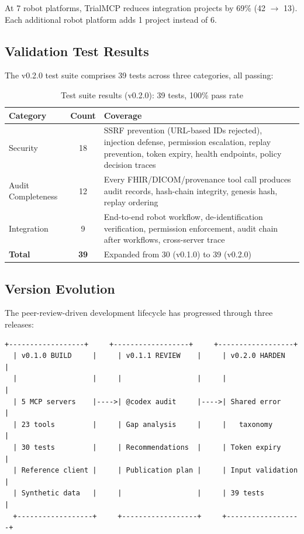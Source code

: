\documentclass[10pt,letterpaper]{article}
\begin{document}
At 7 robot platforms, TrialMCP reduces integration projects by 69\% (42 $\rightarrow$ 13). Each additional robot platform adds 1 project instead of 6.

\subsection{Validation Test Results}

The v0.2.0 test suite comprises 39 tests across three categories, all passing:

\begin{table}[H]
\centering
\caption{Test suite results (v0.2.0): 39 tests, 100\% pass rate}
\label{tab:tests}
\small
\begin{tabularx}{\textwidth}{l c X}
\toprule
\textbf{Category} & \textbf{Count} & \textbf{Coverage} \\
\midrule
Security & 18 & SSRF prevention (URL-based IDs rejected), injection defense, permission escalation, replay prevention, token expiry, health endpoints, policy decision traces \\
Audit Completeness & 12 & Every FHIR/DICOM/provenance tool call produces audit records, hash-chain integrity, genesis hash, replay ordering \\
Integration & 9 & End-to-end robot workflow, de-identification verification, permission enforcement, audit chain after workflows, cross-server trace \\
\midrule
\textbf{Total} & \textbf{39} & Expanded from 30 (v0.1.0) to 39 (v0.2.0) \\
\bottomrule
\end{tabularx}
\end{table}

\subsection{Version Evolution}

The peer-review-driven development lifecycle has progressed through three releases:

\begin{lstlisting}[title={\textbf{Release Progression: v0.1.0 -> v0.1.1 -> v0.2.0}}]
  +------------------+     +------------------+     +------------------+
  | v0.1.0 BUILD     |     | v0.1.1 REVIEW    |     | v0.2.0 HARDEN   |
  |                  |     |                  |     |                  |
  | 5 MCP servers    |---->| @codex audit     |---->| Shared error     |
  | 23 tools         |     | Gap analysis     |     |   taxonomy       |
  | 30 tests         |     | Recommendations  |     | Token expiry     |
  | Reference client |     | Publication plan |     | Input validation |
  | Synthetic data   |     |                  |     | 39 tests         |
  +------------------+     +------------------+     +------------------+
\end{lstlisting}
\end{document}
